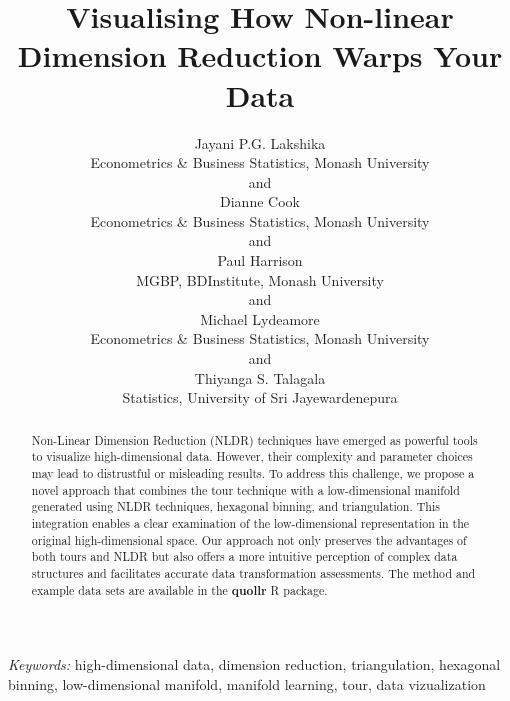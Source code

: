\documentclass[
  12pt]{article}
\begin{document}
\def\spacingset#1{\renewcommand{\baselinestretch}%
{#1}\small\normalsize} \spacingset{1}


\title{\bf Visualising How Non-linear Dimension Reduction Warps Your
Data}
\author{
Jayani P.G. Lakshika\\
Econometrics \& Business Statistics, Monash University\\
and\\Dianne Cook\\
Econometrics \& Business Statistics, Monash University\\
and\\Paul Harrison\\
MGBP, BDInstitute, Monash University\\
and\\Michael Lydeamore\\
Econometrics \& Business Statistics, Monash University\\
and\\Thiyanga S. Talagala\\
Statistics, University of Sri Jayewardenepura\\
}
\maketitle

\bigskip
\bigskip
\begin{abstract}
Non-Linear Dimension Reduction (NLDR) techniques have emerged as
powerful tools to visualize high-dimensional data. However, their
complexity and parameter choices may lead to distrustful or misleading
results. To address this challenge, we propose a novel approach that
combines the tour technique with a low-dimensional manifold generated
using NLDR techniques, hexagonal binning, and triangulation. This
integration enables a clear examination of the low-dimensional
representation in the original high-dimensional space. Our approach not
only preserves the advantages of both tours and NLDR but also offers a
more intuitive perception of complex data structures and facilitates
accurate data transformation assessments. The method and example data
sets are available in the \textbf{quollr} R package.
\end{abstract}

\noindent%
{\it Keywords:} high-dimensional data, dimension
reduction, triangulation, hexagonal binning, low-dimensional
manifold, manifold learning, tour, data vizualization
\vfill
\end{document}
